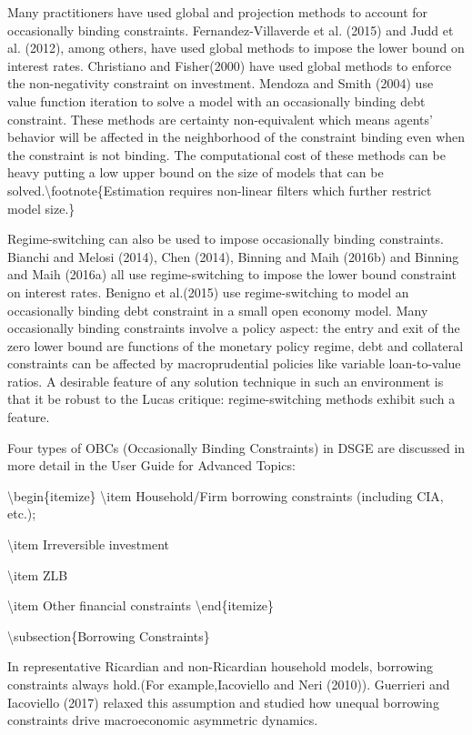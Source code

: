 \documentclass[10pt,math=newtx,citestyle=gb7714-2015,bibstyle=gb7714-2015]{elegantbook}
\begin{document}
	Many practitioners have used global and projection methods to account for occasionally binding constraints. Fernandez-Villaverde et al. (2015) and Judd et al. (2012), among others, have used global methods to impose the lower bound on interest rates. Christiano and Fisher(2000) have used global methods to enforce the non-negativity constraint on investment. Mendoza and Smith (2004) use value function iteration to solve a model with an occasionally binding debt constraint. These methods are certainty non-equivalent which means agents' behavior will be affected in the neighborhood of the constraint binding even when the constraint is not binding. The computational cost of these methods can be heavy putting a low upper bound on the size of models that can be solved.\textbackslash{}footnote\{Estimation requires non-linear filters which further restrict model size.\}
	
	Regime-switching can also be used to impose occasionally binding constraints. Bianchi and Melosi (2014), Chen (2014), Binning and Maih (2016b) and Binning and Maih (2016a) all use regime-switching to impose the lower bound constraint on interest rates. Benigno et al.(2015) use regime-switching to model an occasionally binding debt constraint in a small open economy model. Many occasionally binding constraints involve a policy aspect: the entry and exit of the zero lower bound are functions of the monetary policy regime, debt and collateral constraints can be affected by macroprudential policies like variable loan-to-value ratios. A desirable feature of any solution technique in such an environment is that it be robust to the Lucas critique: regime-switching methods exhibit such a feature.
	
	Four types of OBCs (Occasionally Binding Constraints) in DSGE are discussed in more detail in the User Guide for Advanced Topics:
	
	\textbackslash{}begin\{itemize\}
	\textbackslash{}item Household/Firm borrowing constraints (including CIA, etc.);
	
	\textbackslash{}item Irreversible investment
	
	\textbackslash{}item ZLB
	
	\textbackslash{}item Other financial constraints
	\textbackslash{}end\{itemize\}
	
	\textbackslash{}subsection\{Borrowing Constraints\}
	
	In representative Ricardian and non-Ricardian household models, borrowing constraints always hold.(For example,Iacoviello and Neri (2010)). Guerrieri and Iacoviello (2017) relaxed this assumption and studied how unequal borrowing constraints drive macroeconomic asymmetric dynamics.
	
\end{document}
